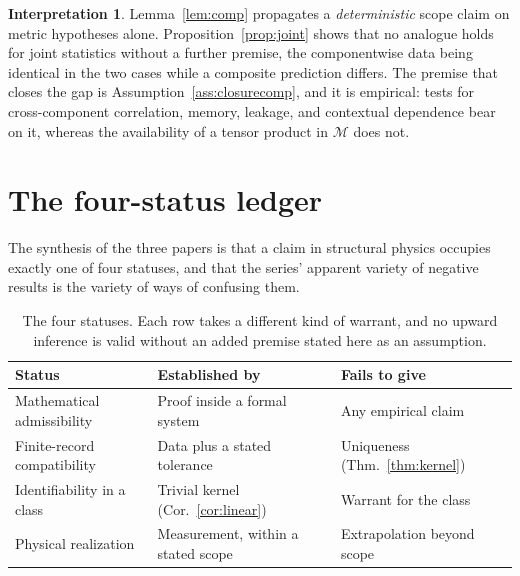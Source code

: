 \documentclass[11pt]{article}
\theoremstyle{definition}
\newtheorem{interpretation}[definition]{Interpretation}
\begin{document}
\begin{interpretation}
\label{int:compose}
Lemma~\ref{lem:comp} propagates a \emph{deterministic} scope claim on metric
hypotheses alone. Proposition~\ref{prop:joint} shows that no analogue holds for
joint statistics without a further premise, the componentwise data being
identical in the two cases while a composite prediction differs. The premise
that closes the gap is Assumption~\ref{ass:closurecomp}, and it is empirical:
tests for cross-component correlation, memory, leakage, and contextual
dependence bear on it, whereas the availability of a tensor product in
$\mathcal M$ does not.
\end{interpretation}

\section{The four-status ledger}
\label{sec:ledger}

The synthesis of the three papers is that a claim in structural physics occupies
exactly one of four statuses, and that the series' apparent variety of negative
results is the variety of ways of confusing them.

\begin{table}[htbp]
\centering
\begin{tabular}{@{}lll@{}}
\toprule
Status & Established by & Fails to give \\
\midrule
Mathematical admissibility & Proof inside a formal system & Any empirical claim \\
Finite-record compatibility & Data plus a stated tolerance & Uniqueness (Thm.~\ref{thm:kernel}) \\
Identifiability in a class & Trivial kernel (Cor.~\ref{cor:linear}) & Warrant for the class \\
Physical realization & Measurement, within a stated scope & Extrapolation beyond scope \\
\bottomrule
\end{tabular}
\caption{The four statuses. Each row takes a different kind of warrant, and no
upward inference is valid without an added premise stated here as an assumption.}
\label{tab:ledger}
\end{table}
\end{document}
